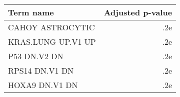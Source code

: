 \begin{tabular}{lr}
\toprule
         Term name &  Adjusted p-value \\
\midrule
  CAHOY ASTROCYTIC &               .2e \\
KRAS.LUNG UP.V1 UP &               .2e \\
      P53 DN.V2 DN &               .2e \\
    RPS14 DN.V1 DN &               .2e \\
    HOXA9 DN.V1 DN &               .2e \\
\bottomrule
\end{tabular}

